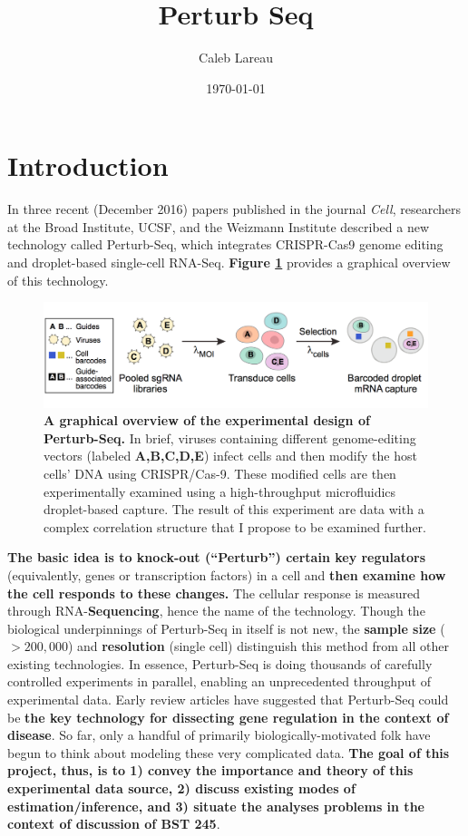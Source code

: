 \documentclass{article}\usepackage[]{graphicx}\usepackage[]{color}
\title{Perturb Seq}
\author{Caleb Lareau}
\date{\today}
\begin{document}
\maketitle

\section*{Introduction}
In three recent (December 2016) papers published  in the journal \textit{Cell}, researchers at the Broad Institute, UCSF, and the Weizmann Institute described a new technology called Perturb-Seq, which integrates CRISPR-Cas9 genome editing and droplet-based single-cell RNA-Seq. \textbf{Figure \ref{fig:overview}} provides a graphical overview of this technology. 

\begin{figure}[ht]
    \centering
    \includegraphics[width=\textwidth]{overview.png}
    \caption{\textbf{A graphical overview of the experimental design of Perturb-Seq.} In brief, viruses containing different genome-editing vectors (labeled \textbf{A,B,C,D,E}) infect cells and then modify the host cells' DNA using CRISPR/Cas-9. These modified cells are then experimentally examined using a high-throughput microfluidics droplet-based capture. The result of this experiment are data with a complex correlation structure that I propose to be examined further.
    \label{fig:overview}}
\end{figure}

\noindent \textbf{The basic idea is to knock-out (``Perturb'') certain key regulators} (equivalently, genes or transcription factors) in a cell and \textbf{then examine how the cell responds to these changes.} The cellular response is measured through RNA-\textbf{Sequencing}, hence the name of the technology. Though the biological underpinnings of Perturb-Seq in itself is not new, the \textbf{sample size} ($> 200,000$) and \textbf{resolution} (single cell) distinguish this method from all other existing technologies. In essence, Perturb-Seq is doing thousands of carefully controlled experiments in parallel, enabling an unprecedented throughput of experimental data. Early review articles have suggested that Perturb-Seq could be \textbf{the key technology for dissecting gene regulation in the context of disease}. So far, only a handful of primarily biologically-motivated folk have begun to think about modeling these very complicated data. \textbf{The goal of this project, thus, is to 1) convey the importance and theory of this experimental data source, 2) discuss existing modes of estimation/inference, and 3) situate the analyses problems in the context of discussion of BST 245}.
\end{document}
